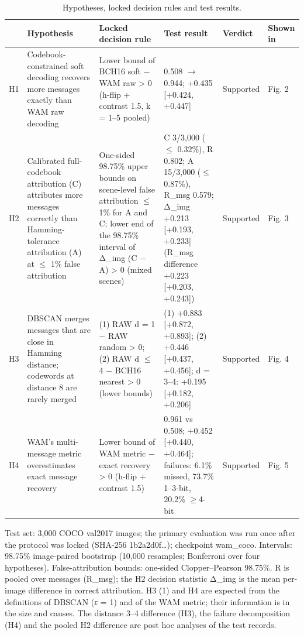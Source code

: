 \begin{table}[t]
\caption{Hypotheses, locked decision rules and test results.}\label{tab:hyp}
\footnotesize
\begin{tabularx}{\textwidth}{@{}l>{\raggedright}X>{\raggedright}X>{\raggedright}Xll@{}}
\toprule
 & Hypothesis & Locked decision rule & Test result & Verdict & Shown in\\
\midrule
H1 & Codebook-constrained soft decoding recovers more messages exactly than WAM raw decoding & Lower bound of BCH16 soft $-$ WAM raw > 0 (h-flip + contrast 1.5, k = 1--5 pooled) & 0.508 $\rightarrow$ 0.944; +0.435 [+0.424, +0.447] & Supported & Fig. 2\\
H2 & Calibrated full-codebook attribution (C) attributes more messages correctly than Hamming-tolerance attribution (A) at $\le$ 1\% false attribution & One-sided 98.75\% upper bounds on scene-level false attribution $\le$ 1\% for A and C; lower end of the 98.75\% interval of Δ_img (C $-$ A) > 0 (mixed scenes) & C 3/3,000 ($\le$ 0.32\%), R 0.802; A 15/3,000 ($\le$ 0.87\%), R_msg 0.579; Δ_img +0.213 [+0.193, +0.233] (R_msg difference +0.223 [+0.203, +0.243]) & Supported & Fig. 3\\
H3 & DBSCAN merges messages that are close in Hamming distance; codewords at distance 8 are rarely merged & (1) RAW d = 1 $-$ RAW random > 0; (2) RAW d $\le$ 4 $-$ BCH16 nearest > 0 (lower bounds) & (1) +0.883 [+0.872, +0.893]; (2) +0.446 [+0.437, +0.456]; d = 3--4: +0.195 [+0.182, +0.206] & Supported & Fig. 4\\
H4 & WAM's multi-message metric overestimates exact message recovery & Lower bound of WAM metric $-$ exact recovery > 0 (h-flip + contrast 1.5) & 0.961 vs 0.508; +0.452 [+0.440, +0.464]; failures: 6.1\% missed, 73.7\% 1--3-bit, 20.2\% $\ge$4-bit & Supported & Fig. 5\\
\bottomrule
\end{tabularx}
\par\smallskip Test set: 3,000 COCO val2017 images; the primary evaluation was run once after the protocol was locked (SHA-256 1b2a2d0f…); checkpoint wam_coco. Intervals: 98.75\% image-paired bootstrap (10,000 resamples; Bonferroni over four hypotheses). False-attribution bounds: one-sided Clopper--Pearson 98.75\%. R is pooled over messages (R_msg); the H2 decision statistic Δ_img is the mean per-image difference in correct attribution. H3 (1) and H4 are expected from the definitions of DBSCAN (ε = 1) and of the WAM metric; their information is in the size and causes. The distance 3--4 difference (H3), the failure decomposition (H4) and the pooled H2 difference are post hoc analyses of the test records.
\end{table}
